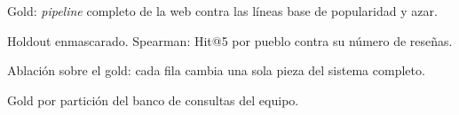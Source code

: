 \documentclass[11pt,a4paper]{article}
\newcommand{\tabla}[1]{\resizebox{\ifdim\width>\linewidth\linewidth\else\width\fi}{!}{}}
\begin{document}
\begin{table}[H]\centering\small
\tabla{final_gold}
\caption{Gold: \emph{pipeline} completo de la web contra las líneas base de popularidad y azar.}
\end{table}

\begin{table}[H]\centering\small
\tabla{final_holdout}
\caption{Holdout enmascarado. Spearman: Hit@5 por pueblo contra su número de reseñas.}
\end{table}

\begin{table}[H]\centering\small
\tabla{final_ablacion}
\caption{Ablación sobre el gold: cada fila cambia una sola pieza del sistema completo.}
\end{table}

\begin{table}[H]\centering\small
\tabla{final_particiones}
\caption{Gold por partición del banco de consultas del equipo.}
\end{table}
\end{document}
